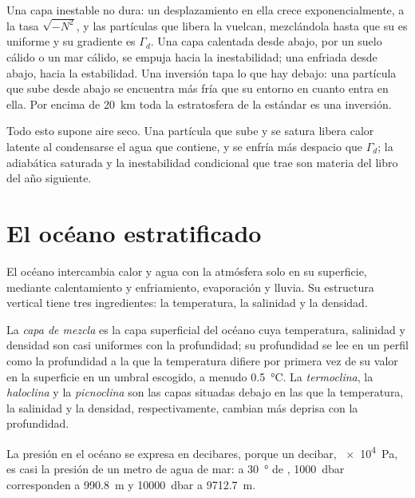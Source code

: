 Una capa inestable no dura: un desplazamiento en ella crece exponencialmente, a la tasa $\sqrt{-N^2}$, y las partículas que libera la vuelcan, mezclándola hasta que su  es uniforme y su gradiente es $\Gamma_d$. Una capa calentada desde abajo, por un suelo cálido o un mar cálido, se empuja hacia la inestabilidad; una enfriada desde abajo, hacia la estabilidad. Una inversión tapa lo que hay debajo: una partícula que sube desde abajo se encuentra más fría que su entorno en cuanto entra en ella. Por encima de \qty{20}{km} toda la estratosfera de la estándar es una inversión.

Todo esto supone aire seco. Una partícula que sube y se satura libera calor latente al condensarse el agua que contiene, y se enfría más despacio que $\Gamma_d$; la adiabática saturada y la inestabilidad condicional que trae son materia del libro del año siguiente.

\section{El océano estratificado}\label{sec:b1:fluid-envelopes-structure:ocean}

El océano intercambia calor y agua con la atmósfera solo en su superficie, mediante calentamiento y enfriamiento, evaporación y lluvia. Su estructura vertical tiene tres ingredientes: la temperatura, la salinidad y la densidad.

\begin{definition}\label{def:b1:fluid-envelopes-structure:ocean-layers}
La \emph{capa de mezcla} es la capa superficial del océano cuya temperatura, salinidad y densidad son casi uniformes con la profundidad; su profundidad se lee en un perfil como la profundidad a la que la temperatura difiere por primera vez de su valor en la superficie en un umbral escogido, a menudo \qty{0.5}{\celsius}. La
\emph{termoclina}, la \emph{haloclina} y la
\emph{picnoclina} son las capas situadas debajo en las que la temperatura, la salinidad y la densidad, respectivamente, cambian más deprisa con la profundidad.
\end{definition}

La presión en el océano se expresa en decibares, porque un decibar, \qty{e4}{Pa}, es casi la presión de un metro de agua de mar: a \qty{30}{\degree} de , \qty{1000}{dbar} corresponden a \qty{990.8}{m} y \qty{10000}{dbar} a \qty{9712.7}{m}.

